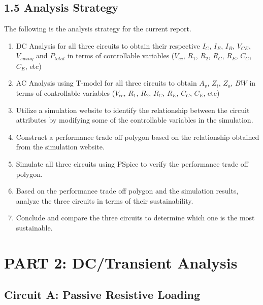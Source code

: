 \documentclass[11pt, a4paper]{article}
\begin{document}
\subsection*{1.5 Analysis Strategy}

The following is the analysis strategy for the current report.
\begin{enumerate}
    \item DC Analysis for all three circuits to obtain their respective $I_C$, $I_E$, $I_B$, $V_{CE}$, $V_{swing}$ and $P_{total}$ in terms of controllable variables ($V_{cc}$, $R_1$, $R_2$, $R_C$, $R_E$, $C_C$, $C_E$, etc)
    \item AC Analysis using T-model for all three circuits to obtain $A_v$, $Z_i$, $Z_o$, $BW$ in terms of controllable variables ($V_{cc}$, $R_1$, $R_2$, $R_C$, $R_E$, $C_C$, $C_E$, etc)
    \item Utilize a simulation website to identify the relationship between the circuit attributes by modifying some of the controllable variables in the simulation.
    \item Construct a performance trade off polygon based on the relationship obtained from the simulation website.
    \item Simulate all three circuits using PSpice to verify the performance trade off polygon.
    \item Based on the performance trade off polygon and the simulation results, analyze the three circuits in terms of their sustainability.
    \item Conclude and compare the three circuits to determine which one is the most sustainable.
\end{enumerate}

\newpage

\section*{PART 2: DC/Transient Analysis}


\subsection*{Circuit A: Passive Resistive Loading}
\end{document}
